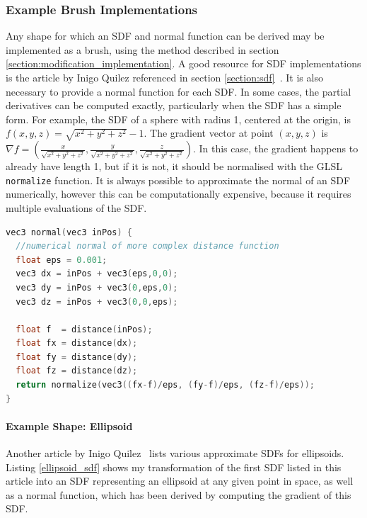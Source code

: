 \documentclass[11pt]{article}
\begin{document}
\subsubsection{Example Brush Implementations}
\label{example_brushes}
Any shape for which an SDF and normal function can be derived may be implemented as a brush, using the method described in section \ref{section:modification_implementation}. A good resource for SDF implementations is the article by Inigo Quilez referenced in section \ref{section:sdf}~\cite{quilez:sdf}. It is also necessary to provide a normal function for each SDF. In some cases, the partial derivatives can be computed exactly, particularly when the SDF has a simple form. For example, the SDF of a sphere with radius 1, centered at the origin, is $f\left(x,y,z\right) = \sqrt{x^2+y^2+z^2}-1$. The gradient vector at point $\left(x,y,z\right)$ is $\nabla f = \left(\frac{x}{\sqrt{x^2+y^2+z^2}},\frac{y}{\sqrt{x^2+y^2+z^2}},\frac{z}{\sqrt{x^2+y^2+z^2}}\right)$. In this case, the gradient happens to already have length 1, but if it is not, it should be normalised with the GLSL \texttt{normalize} function. It is always possible to approximate the normal of an SDF numerically, however this can be computationally expensive, because it requires multiple evaluations of the SDF.

\begin{lstlisting}[language=C++,label={numerical_gradient},caption={Approximation of the normal of an SDF, using the method of finite differences.}]
vec3 normal(vec3 inPos) {
  //numerical normal of more complex distance function
  float eps = 0.001;
  vec3 dx = inPos + vec3(eps,0,0);
  vec3 dy = inPos + vec3(0,eps,0);
  vec3 dz = inPos + vec3(0,0,eps);

  float f  = distance(inPos);
  float fx = distance(dx);
  float fy = distance(dy);
  float fz = distance(dz);
  return normalize(vec3((fx-f)/eps, (fy-f)/eps, (fz-f)/eps));
}
\end{lstlisting}

\paragraph{Example Shape: Ellipsoid}
Another article by Inigo Quilez~\cite{quilez:ellipsoid} lists various approximate SDFs for ellipsoids. Listing \ref{ellipsoid_sdf} shows my transformation of the first SDF listed in this article into an SDF representing an ellipsoid at any given point in space, as well as a normal function, which has been derived by computing the gradient of this SDF.
\end{document}
